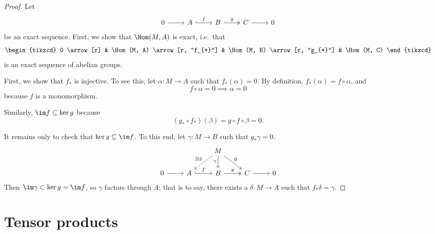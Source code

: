 \documentclass[main.tex]{subfiles}
\begin{document}
\begin{proof}
  Let
  \begin{equation*}
    \begin{tikzcd}
      0
      \arrow[r]
      & A
      \arrow[r, hookrightarrow, "f"]
      & B
      \arrow[r, twoheadrightarrow, "g"]
      & C
      \arrow[r]
      & 0
    \end{tikzcd}
  \end{equation*}
  be an exact sequence. First, we show that $\Hom(M, A)$ is exact, i.e.\ that
  \begin{equation*}
    \begin{tikzcd}
      0
      \arrow[r]
      & \Hom(M, A)
      \arrow[r, "f_{*}"]
      & \Hom(M, B)
      \arrow[r, "g_{*}"]
      & \Hom(M, C)
    \end{tikzcd}
  \end{equation*}
  is an exact sequence of abelian groups.

  First, we show that $f_{*}$ is injective. To see this, let $\alpha\colon M \to A$ such that $f_{*}(\alpha) = 0$. By definition, $f_{*}(\alpha) = f \circ \alpha$, and 
  \begin{equation*}
    f \circ \alpha = 0 \implies \alpha = 0
  \end{equation*}
  because $f$ is a monomorphism.

  Similarly, $\im f \subseteq \ker g$ because
  \begin{equation*}
    (g_{*} \circ f_{*})(\beta) = g \circ f \circ \beta = 0.
  \end{equation*}

  It remains only to check that $\ker g \subseteq \im f$. To this end, let $\gamma\colon M \to B$ such that $g_{*}\gamma = 0$.
  \begin{equation*}
    \begin{tikzcd}
      && M
      \arrow[d, swap, "\gamma"]
      \arrow[dr, "0"]
      \arrow[dl, swap, dashed, "\exists!\delta"]
      \\
      0
      \arrow[r]
      & A
      \arrow[r, hookrightarrow, "f"]
      & B
      \arrow[r, twoheadrightarrow, "g"]
      & C
      \arrow[r]
      & 0
    \end{tikzcd}
  \end{equation*}
  Then $\im \gamma \subset \ker g = \im f$, so $\gamma$ factors through $A$; that is to say, there exists a $\delta\colon M \to A$ such that $f_{*}\delta = \gamma$.
\end{proof}

\section{Tensor products}
\label{sec:tensor_products}
\end{document}
